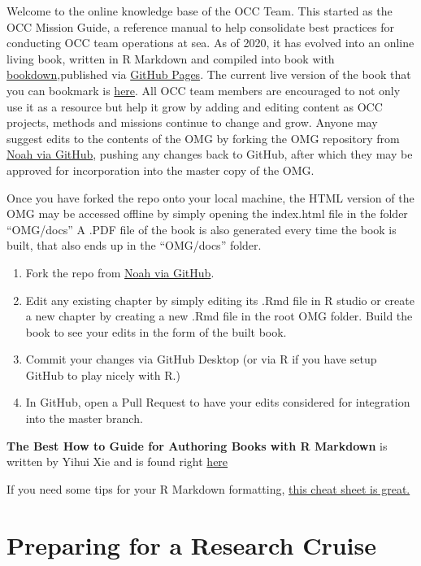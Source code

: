 \documentclass[]{book}
\providecommand{\tightlist}{%
  \setlength{\itemsep}{0pt}\setlength{\parskip}{0pt}}
\begin{document}
Welcome to the online knowledge base of the OCC Team. This started as the OCC Mission Guide, a reference manual to help consolidate best practices for conducting OCC team operations at sea. As of 2020, it has evolved into an online living book, written in R Markdown and compiled into book with \href{https://bookdown.org/yihui/bookdown/}{bookdown},published via \href{https://pages.github.com/}{GitHub Pages}. The current live version of the book that you can bookmark is \href{https://npomeroy.github.io/OMG/}{here}. All OCC team members are encouraged to not only use it as a resource but help it grow by adding and editing content as OCC projects, methods and missions continue to change and grow. Anyone may suggest edits to the contents of the OMG by forking the OMG repository from \href{https://github.com/npomeroy/OMG}{Noah via GitHub}, pushing any changes back to GitHub, after which they may be approved for incorporation into the master copy of the OMG.

Once you have forked the repo onto your local machine, the HTML version of the OMG may be accessed offline by simply opening the index.html file in the folder ``OMG/docs'' A .PDF file of the book is also generated every time the book is built, that also ends up in the ``OMG/docs'' folder.

\begin{enumerate}
\def\labelenumi{\arabic{enumi}.}
\tightlist
\item
  Fork the repo from \href{https://github.com/npomeroy/OMG}{Noah via GitHub}.
\item
  Edit any existing chapter by simply editing its .Rmd file in R studio or create a new chapter by creating a new .Rmd file in the root OMG folder. Build the book to see your edits in the form of the built book.
\item
  Commit your changes via GitHub Desktop (or via R if you have setup GitHub to play nicely with R.)
\item
  In GitHub, open a Pull Request to have your edits considered for integration into the master branch.
\end{enumerate}

\textbf{The Best How to Guide for Authoring Books with R Markdown} is written by Yihui Xie and is found right \href{https://bookdown.org/yihui/bookdown/}{here}

If you need some tips for your R Markdown formatting, \href{https://rmarkdown.rstudio.com/lesson-15.html}{this cheat sheet is great.}

\hypertarget{cruise_prep}{%
\chapter{Preparing for a Research Cruise}\label{cruise_prep}}
\end{document}
